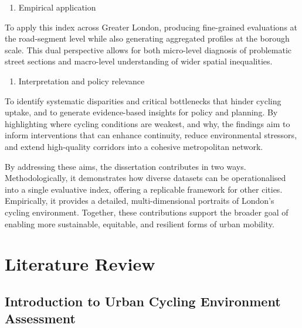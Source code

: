 \documentclass[
  12pt,
  oneside]{book}
\providecommand{\tightlist}{%
  \setlength{\itemsep}{0pt}\setlength{\parskip}{0pt}}
\begin{document}
\begin{enumerate}
\def\labelenumi{\arabic{enumi}.}
\setcounter{enumi}{1}
\tightlist
\item
  Empirical application
\end{enumerate}

To apply this index across Greater London, producing fine-grained evaluations at the road-segment level while also generating aggregated profiles at the borough scale. This dual perspective allows for both micro-level diagnosis of problematic street sections and macro-level understanding of wider spatial inequalities.

\begin{enumerate}
\def\labelenumi{\arabic{enumi}.}
\setcounter{enumi}{2}
\tightlist
\item
  Interpretation and policy relevance
\end{enumerate}

To identify systematic disparities and critical bottlenecks that hinder cycling uptake, and to generate evidence-based insights for policy and planning. By highlighting where cycling conditions are weakest, and why, the findings aim to inform interventions that can enhance continuity, reduce environmental stressors, and extend high-quality corridors into a cohesive metropolitan network.

By addressing these aims, the dissertation contributes in two ways. Methodologically, it demonstrates how diverse datasets can be operationalised into a single evaluative index, offering a replicable framework for other cities. Empirically, it provides a detailed, multi-dimensional portraits of London's cycling environment. Together, these contributions support the broader goal of enabling more sustainable, equitable, and resilient forms of urban mobility.

\chapter{Literature Review}\label{literature-review}

\section{Introduction to Urban Cycling Environment Assessment}\label{introduction-to-urban-cycling-environment-assessment}
\end{document}
